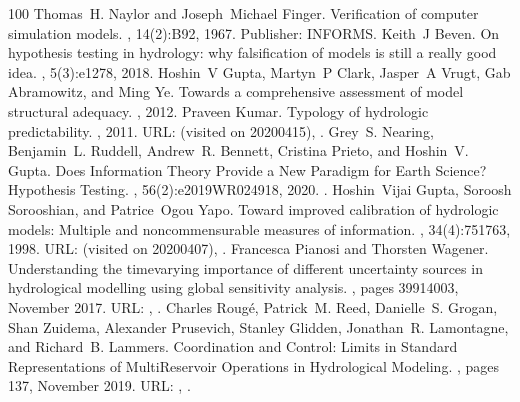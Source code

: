 \documentclass[letterpaper,10pt,english]{sphinxmanual}
\begin{document}
\begin{sphinxthebibliography}{100}
\sphinxAtStartPar
Thomas H. Naylor and Joseph Michael Finger. Verification of computer simulation models. , 14(2):B\textendash{}92, 1967. Publisher: INFORMS.
\sphinxAtStartPar
Keith J Beven. On hypothesis testing in hydrology: why falsification of models is still a really good idea. , 5(3):e1278, 2018.
\sphinxAtStartPar
Hoshin V Gupta, Martyn P Clark, Jasper A Vrugt, Gab Abramowitz, and Ming Ye. Towards a comprehensive assessment of model structural adequacy. , 2012.
\sphinxAtStartPar
Praveen Kumar. Typology of hydrologic predictability. , 2011. URL:  (visited on 2020\sphinxhyphen{}04\sphinxhyphen{}15), .
\sphinxAtStartPar
Grey S. Nearing, Benjamin L. Ruddell, Andrew R. Bennett, Cristina Prieto, and Hoshin V. Gupta. Does Information Theory Provide a New Paradigm for Earth Science? Hypothesis Testing. , 56(2):e2019WR024918, 2020. .
\sphinxAtStartPar
Hoshin Vijai Gupta, Soroosh Sorooshian, and Patrice Ogou Yapo. Toward improved calibration of hydrologic models: Multiple and noncommensurable measures of information. , 34(4):751\textendash{}763, 1998. URL:  (visited on 2020\sphinxhyphen{}04\sphinxhyphen{}07), .
\sphinxAtStartPar
Francesca Pianosi and Thorsten Wagener. Understanding the time\sphinxhyphen{}varying importance of different uncertainty sources in hydrological modelling using global sensitivity analysis. , pages 3991\textendash{}4003, November 2017. URL: , .
\sphinxAtStartPar
Charles Rougé, Patrick M. Reed, Danielle S. Grogan, Shan Zuidema, Alexander Prusevich, Stanley Glidden, Jonathan R. Lamontagne, and Richard B. Lammers. Coordination and Control: Limits in Standard Representations of Multi\sphinxhyphen{}Reservoir Operations in Hydrological Modeling. , pages 1\textendash{}37, November 2019. URL: , .

\end{sphinxthebibliography}
\end{document}
